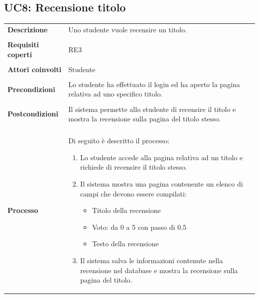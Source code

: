 \documentclass[10pt,a4paper]{report}
\begin{document}
	\subsection{UC8: Recensione titolo}
	\begin{tabular}{lp{}}
		\textbf{Descrizione}&Uno studente vuole recensire un titolo.\\
		\\
		\textbf{Requisiti coperti}&RE3\\
		\\
		\textbf{Attori coinvolti}&Studente\\
		\\
		\textbf{Precondizioni}&Lo studente ha effettuato il login ed ha aperto la pagina relativa ad uno specifico titolo.\\
		\\
		\textbf{Postcondizioni}&Il sistema permette allo studente di recensire il titolo e mostra la recensione sulla pagina del titolo stesso.\\
		\\
		\textbf{Processo}&Di seguito è descritto il processo:
		\begin{enumerate}
			\item Lo studente accede alla pagina relativa ad un titolo e richiede di recensire il titolo stesso.
			\item Il sistema mostra una pagina contenente un elenco di campi che devono essere compilati:
			\begin{itemize}
				\item Titolo della recensione
				\item Voto: da 0 a 5 con passo di 0.5
				\item Testo della recensione
			\end{itemize}
			\item Il sistema salva le informazioni contenute nella recensione nel database e mostra la recensione sulla pagina del titolo.
		\end{enumerate}
	\end{tabular}
\end{document}
